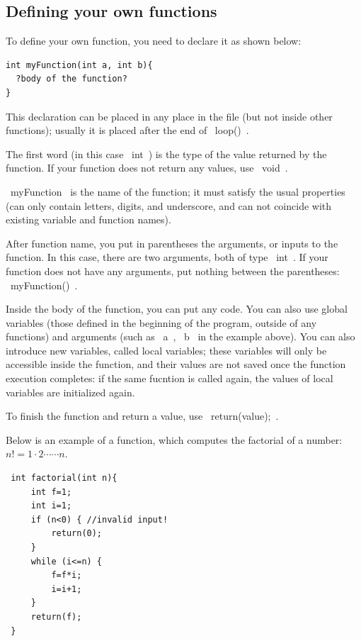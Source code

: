 \documentclass[oneside]{stml-l}
\numberwithin{figure}{chapter}
\begin{document}
\subsection*{Defining your own functions}

To define your own function, you need to declare it as shown below:
\begin{lstlisting}
int myFunction(int a, int b){
  ?body of the function?
}
\end{lstlisting}

This declaration can be placed in any place in the file (but not
inside other functions); usually it is placed after the end of ~loop()~.

The first word (in this case ~int~) is the type of the value returned by the
function. If your function does not return any values, use ~void~.

~myFunction~ is the name of the function; it must satisfy the usual properties
(can only contain letters, digits, and underscore, and can not coincide with existing
variable and function names).

After function name, you put in parentheses the arguments, or inputs to the
function. In this case, there are two arguments, both of type ~int~. If your
function does not have any arguments, put nothing between the parentheses:
~myFunction()~.

Inside the body of the function, you can put any code. You can also use global
variables (those defined in the beginning of the program, outside of any
functions) and arguments (such as ~a~, ~b~ in the example above). You can
also introduce new variables, called local variables; these variables will only be
accessible inside the function, and their values are not saved once the function
execution completes: if the same fucntion is called again, the values of local
variables are initialized again.

To finish the function and return a value, use ~return(value);~.

Below is an example of a function, which computes the factorial of a number:
$n!=1\cdot 2\cdots \cdots n$.
 \begin{lstlisting}
 int factorial(int n){
     int f=1;
     int i=1;
     if (n<0) { //invalid input!
         return(0);
     }
     while (i<=n) {
         f=f*i;
         i=i+1;
     }
     return(f);
 }
 \end{lstlisting}
\end{document}
